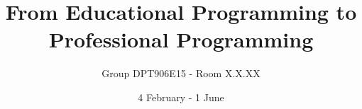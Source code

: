 \usepackage[english]{babel}
\usepackage[utf8]{inputenc}
\usepackage[T1]{fontenc}
\usepackage{graphicx}
\usepackage{lscape}%
\usepackage{cite}
\usepackage{setspace}
\usepackage[hyphens]{url}
\usepackage{times}
\usepackage[backref]{hyperref}
\usepackage{verbatim}
\usepackage{wrapfig} %
\usepackage{float}
\usepackage{listings}
\usepackage{color}
\usepackage{textcomp}
\usepackage{mathtools}
\usepackage{fullpage}
\usepackage{lastpage}
\usepackage{pdfpages}
\usepackage{enumitem}
\usepackage{amsfonts} %
\usepackage{booktabs}
\usepackage{multirow}
\usepackage{caption}
\usepackage{subcaption}
\usepackage[babel=true,strict=true,german=quotes,threshold=1]{csquotes}
\usepackage{tikz}
\usepackage{pgfplots}
\usepackage{enumitem}
\usetikzlibrary{patterns}
\pgfplotsset{width=7cm,compat=1.10}


\usepackage{listings}

\setlength{\parindent}{0pt}
\setlength{\parskip}{1.5ex}

\title{From Educational Programming to Professional Programming}
\author{Group DPT906E15 - Room X.X.XX}
\date{4 February - 1 June}

\newcommand{\figref}[1]{Figure~\ref{#1}}
\newcommand{\secref}[1]{Section~\ref{#1}}
\newcommand{\tabref}[1]{Table~\ref{#1}}
\newcommand{\chapref}[1]{Chapter~\ref{#1}}
\newcommand{\appref}[1]{Appendix~\ref{#1}}
\newcommand{\partref}[1]{Part~\ref{#1}}
\newcommand{\lstref}[1]{Listing~\ref{#1}}
\newcommand{\algoref}[1]{Algorithm~\ref{#1}}
\newcommand{\hypref}[1]{Hypothesis~\ref{#1}}
\newcommand{\equref}[1]{Equation~\eqref{#1}}
\newcommand\todo[1]{\textcolor{red}{TODO: #1}} %